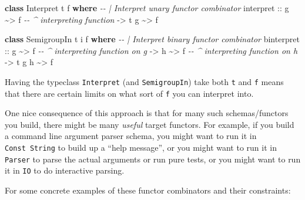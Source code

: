 \documentclass[]{article}
\newenvironment{Shaded}{}{}
\newcommand{\CommentTok}[1]{\textcolor[rgb]{0.38,0.63,0.69}{\textit{#1}}}
\newcommand{\DataTypeTok}[1]{\textcolor[rgb]{0.56,0.13,0.00}{#1}}
\newcommand{\KeywordTok}[1]{\textcolor[rgb]{0.00,0.44,0.13}{\textbf{#1}}}
\newcommand{\NormalTok}[1]{#1}
\newcommand{\OperatorTok}[1]{\textcolor[rgb]{0.40,0.40,0.40}{#1}}
\newcommand{\OtherTok}[1]{\textcolor[rgb]{0.00,0.44,0.13}{#1}}
\begin{document}
\begin{Shaded}
\begin{Highlighting}[]
\KeywordTok{class} \DataTypeTok{Interpret}\NormalTok{ t f }\KeywordTok{where}
    \CommentTok{{-}{-} | Interpret unary functor combinator}
\NormalTok{    interpret}
\OtherTok{        ::}\NormalTok{ g }\OperatorTok{\textasciitilde{}\textgreater{}}\NormalTok{ f             }\CommentTok{{-}{-} \^{} interpreting function}
        \OtherTok{{-}\textgreater{}}\NormalTok{ t g }\OperatorTok{\textasciitilde{}\textgreater{}}\NormalTok{ f}

\KeywordTok{class} \DataTypeTok{SemigroupIn}\NormalTok{ t i f }\KeywordTok{where}
    \CommentTok{{-}{-} | Interpret binary functor combinator}
\NormalTok{    binterpret}
\OtherTok{        ::}\NormalTok{ g }\OperatorTok{\textasciitilde{}\textgreater{}}\NormalTok{ f             }\CommentTok{{-}{-} \^{} interpreting function on g}
        \OtherTok{{-}\textgreater{}}\NormalTok{ h }\OperatorTok{\textasciitilde{}\textgreater{}}\NormalTok{ f             }\CommentTok{{-}{-} \^{} interpreting function on h}
        \OtherTok{{-}\textgreater{}}\NormalTok{ t g h }\OperatorTok{\textasciitilde{}\textgreater{}}\NormalTok{ f}
\end{Highlighting}
\end{Shaded}

Having the typeclass \texttt{Interpret} (and \texttt{SemigroupIn}) take both
\texttt{t} and \texttt{f} means that there are certain limits on what sort of
\texttt{f} you can interpret into.

One nice consequence of this approach is that for many such schemas/functors you
build, there might be many \emph{useful} target functors. For example, if you
build a command line argument parser schema, you might want to run it in
\texttt{Const\ String} to build up a ``help message'', or you might want to run
it in \texttt{Parser} to parse the actual arguments or run pure tests, or you
might want to run it in \texttt{IO} to do interactive parsing.

For some concrete examples of these functor combinators and their constraints:
\end{document}

